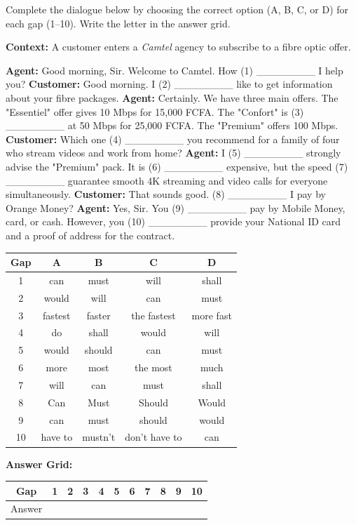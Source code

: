 \documentclass[11pt]{article}
\begin{document}
\begin{exercice}
Complete the dialogue below by choosing the correct option (A, B, C, or D) for each gap (1--10). Write the letter in the answer grid.

\textbf{Context:} A customer enters a \textit{Camtel} agency to subscribe to a fibre optic offer.

\textbf{Agent:} Good morning, Sir. Welcome to Camtel. How (1) \_\_\_\_\_\_\_\_ I help you?
\textbf{Customer:} Good morning. I (2) \_\_\_\_\_\_\_\_ like to get information about your fibre packages.
\textbf{Agent:} Certainly. We have three main offers. The "Essentiel" offer gives 10 Mbps for 15,000 FCFA. The "Confort" is (3) \_\_\_\_\_\_\_\_ at 50 Mbps for 25,000 FCFA. The "Premium" offers 100 Mbps.
\textbf{Customer:} Which one (4) \_\_\_\_\_\_\_\_ you recommend for a family of four who stream videos and work from home?
\textbf{Agent:} I (5) \_\_\_\_\_\_\_\_ strongly advise the "Premium" pack. It is (6) \_\_\_\_\_\_\_\_ expensive, but the speed (7) \_\_\_\_\_\_\_\_ guarantee smooth 4K streaming and video calls for everyone simultaneously.
\textbf{Customer:} That sounds good. (8) \_\_\_\_\_\_\_\_ I pay by Orange Money?
\textbf{Agent:} Yes, Sir. You (9) \_\_\_\_\_\_\_\_ pay by Mobile Money, card, or cash. However, you (10) \_\_\_\_\_\_\_\_ provide your National ID card and a proof of address for the contract.

\begin{center}
\begin{tabular}{|c|c|c|c|c|}\hline
\textbf{Gap} & \textbf{A} & \textbf{B} & \textbf{C} & \textbf{D} \\\hline
1 & can & must & will & shall \\\hline
2 & would & will & can & must \\\hline
3 & fastest & faster & the fastest & more fast \\\hline
4 & do & shall & would & will \\\hline
5 & would & should & can & must \\\hline
6 & more & most & the most & much \\\hline
7 & will & can & must & shall \\\hline
8 & Can & Must & Should & Would \\\hline
9 & can & must & should & would \\\hline
10 & have to & mustn't & don't have to & can \\\hline
\end{tabular}
\end{center}

\textbf{Answer Grid:}
\begin{center}
\begin{tabular}{|c|c|c|c|c|c|c|c|c|c|c|}\hline
Gap & 1 & 2 & 3 & 4 & 5 & 6 & 7 & 8 & 9 & 10 \\\hline
Answer & & & & & & & & & & \\\hline
\end{tabular}
\end{center}
\end{exercice}
\end{document}

